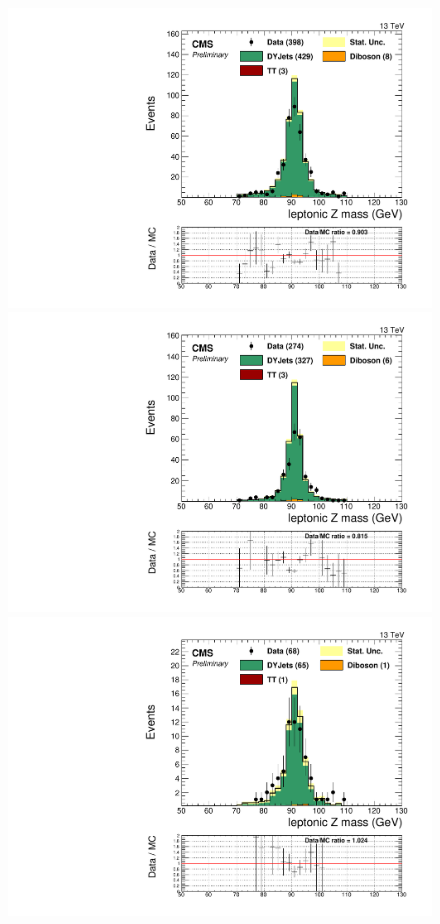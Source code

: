 \begin{figure}[h]
\begin{center}
\includegraphics[scale=0.37]{figures/control/massZllMLP.pdf}
\includegraphics[scale=0.37]{figures/control/massZllELP.pdf}\\[2cm]
\includegraphics[scale=0.37]{figures/control/massZllMHP.pdf}

\end{center}
\end{figure}
